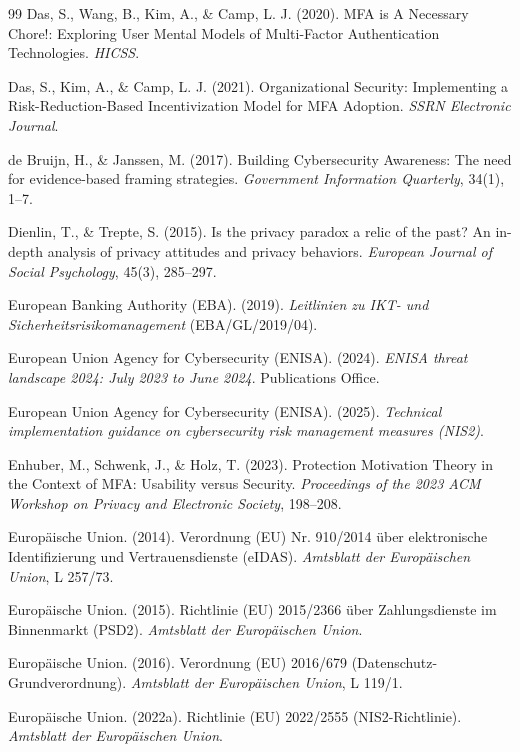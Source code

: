 \begin{thebibliography}{99}
Das, S., Wang, B., Kim, A., \& Camp, L. J. (2020). MFA is A Necessary Chore!: Exploring User Mental Models of Multi-Factor Authentication Technologies. \textit{HICSS}.

Das, S., Kim, A., \& Camp, L. J. (2021). Organizational Security: Implementing a Risk-Reduction-Based Incentivization Model for MFA Adoption. \textit{SSRN Electronic Journal}.

de Bruijn, H., \& Janssen, M. (2017). Building Cybersecurity Awareness: The need for evidence-based framing strategies. \textit{Government Information Quarterly}, 34(1), 1--7.

Dienlin, T., \& Trepte, S. (2015). Is the privacy paradox a relic of the past? An in-depth analysis of privacy attitudes and privacy behaviors. \textit{European Journal of Social Psychology}, 45(3), 285--297.

European Banking Authority (EBA). (2019). \textit{Leitlinien zu IKT- und Sicherheitsrisikomanagement} (EBA/GL/2019/04).

European Union Agency for Cybersecurity (ENISA). (2024). \textit{ENISA threat landscape 2024: July 2023 to June 2024}. Publications Office.

European Union Agency for Cybersecurity (ENISA). (2025). \textit{Technical implementation guidance on cybersecurity risk management measures (NIS2)}.

Enhuber, M., Schwenk, J., \& Holz, T. (2023). Protection Motivation Theory in the Context of MFA: Usability versus Security. \textit{Proceedings of the 2023 ACM Workshop on Privacy and Electronic Society}, 198--208.

Europäische Union. (2014). Verordnung (EU) Nr. 910/2014 über elektronische Identifizierung und Vertrauensdienste (eIDAS). \textit{Amtsblatt der Europäischen Union}, L 257/73.

Europäische Union. (2015). Richtlinie (EU) 2015/2366 über Zahlungsdienste im Binnenmarkt (PSD2). \textit{Amtsblatt der Europäischen Union}.

Europäische Union. (2016). Verordnung (EU) 2016/679 (Datenschutz-Grundverordnung). \textit{Amtsblatt der Europäischen Union}, L 119/1.

Europäische Union. (2022a). Richtlinie (EU) 2022/2555 (NIS2-Richtlinie). \textit{Amtsblatt der Europäischen Union}.


\end{thebibliography}
